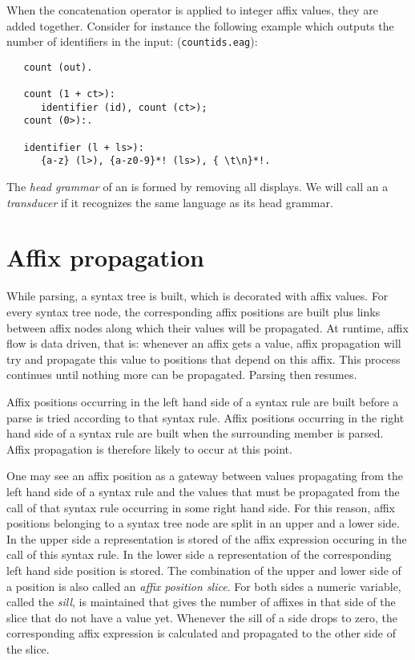 When the concatenation operator is applied to integer affix values,
they are added together. Consider for instance the following example
which outputs the number of identifiers in the input:
({\tt countids.eag}):
\begin{verbatim}
   count (out).

   count (1 + ct>):
      identifier (id), count (ct>);
   count (0>):.

   identifier (l + ls>):
      {a-z} (l>), {a-z0-9}*! (ls>), { \t\n}*!.
\end{verbatim}

The {\em head grammar} of an \EAG is formed by removing all displays.
We will call an \EAG a {\em transducer} if it recognizes the same language
as its head grammar.
\section {Affix propagation}
While parsing, a syntax tree is built, which is decorated with
affix values. For every syntax tree node, the corresponding
affix positions are built plus links between affix
nodes along which their values will be propagated. At runtime,
affix flow is data driven, that is: whenever an affix gets a value,
affix propagation will try and propagate this value to positions
that depend on this affix. This process continues
until nothing more can be propagated. Parsing then resumes.

Affix positions occurring in the left hand side of a syntax rule
are built before a parse is tried according to that syntax rule.
Affix positions occurring in the right hand side of a syntax rule
are built when the surrounding member is parsed. Affix propagation
is therefore likely to occur at this point.

One may see an affix position as a gateway between values
propagating from the left hand side of a syntax rule and
the values that must be propagated from the call of that
syntax rule occurring in some right hand side. For this
reason, affix positions belonging to a syntax tree node
are split in an upper and a lower side. In the upper side
a representation is stored of the affix expression occuring
in the call of this syntax rule. In the lower side a representation
of the corresponding left hand side position is stored.
The combination of the upper and lower side of a position
is also called an {\em affix position slice}. For both sides
a numeric variable, called the {\em sill}, is maintained
that gives the number of affixes in that side of the slice
that do not have a value yet. Whenever the sill of a side drops
to zero, the corresponding affix expression is calculated
and propagated to the other side of the slice.


